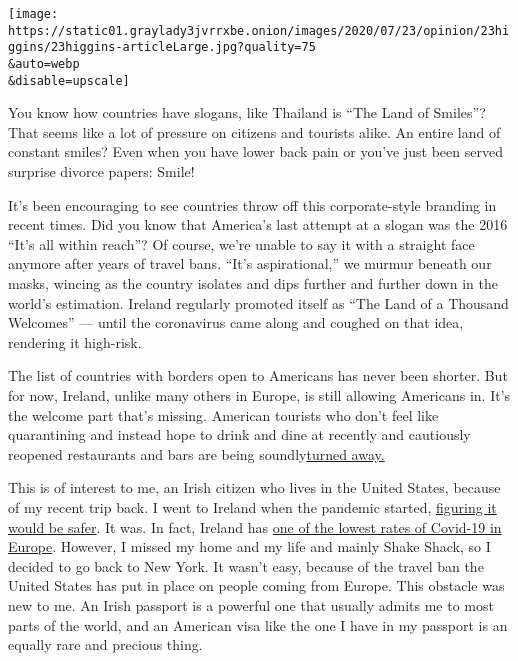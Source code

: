 \texttt{[image: https://static01.graylady3jvrrxbe.onion/images/2020/07/23/opinion/23higgins/23higgins-articleLarge.jpg?quality=75\\\&auto=webp\\\&disable=upscale]}

You know how countries have slogans, like Thailand is ``The Land of
Smiles''? That seems like a lot of pressure on citizens and tourists
alike. An entire land of constant smiles? Even when you have lower back
pain or you've just been served surprise divorce papers: Smile!

It's been encouraging to see countries throw off this corporate-style
branding in recent times. Did you know that America's last attempt at a
slogan was the 2016 ``It's all within reach''? Of course, we're unable
to say it with a straight face anymore after years of travel bans.
``It's aspirational,'' we murmur beneath our masks, wincing as the
country isolates and dips further and further down in the world's
estimation. Ireland regularly promoted itself as ``The Land of a
Thousand Welcomes'' --- until the coronavirus came along and coughed on
that idea, rendering it high-risk.

The list of countries with borders open to Americans has never been
shorter. But for now, Ireland, unlike many others in Europe, is still
allowing Americans in. It's the welcome part that's missing. American
tourists who don't feel like quarantining and instead hope to drink and
dine at recently and cautiously reopened restaurants and bars are being
soundly\href{https://www.nytimes3xbfgragh.onion/2020/07/14/world/europe/Ireland-americans-break-quarantine.html}{turned
away.}

This is of interest to me, an Irish citizen who lives in the United
States, because of my recent trip back. I went to Ireland when the
pandemic started,
\href{https://www.nytimes3xbfgragh.onion/2020/04/11/opinion/sunday/coronavirus-isolation-ireland.html}{figuring
it would be safer}. It was. In fact, Ireland has
\href{https://www.irishtimes.com/news/health/ireland-has-lowest-current-incidence-of-covid-19-in-western-europe-1.4294642}{one
of the lowest rates of Covid-19 in Europe}. However, I missed my home
and my life and mainly Shake Shack, so I decided to go back to New York.
It wasn't easy, because of the travel ban the United States has put in
place on people coming from Europe. This obstacle was new to me. An
Irish passport is a powerful one that usually admits me to most parts of
the world, and an American visa like the one I have in my passport is an
equally rare and precious thing.

